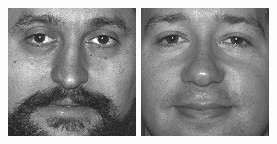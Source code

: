 \begin{figure}[ht]
\begin{center}
  \includegraphics[width=\columnwidth/10]{ch5/figures/feret23.jpg}
  \includegraphics[width=\columnwidth/10]{ch5/figures/feret24.jpg}\\

\end{center}
\end{figure}
